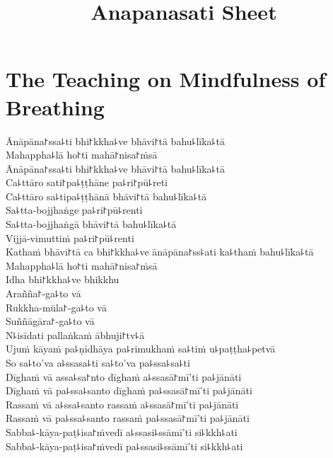 \documentclass[
  babelLanguage=english,
  final,
  webversion,
]{chantingbook}
\title{Anapanasati Sheet}
\begin{document}
\mainmatter


\chapter{The Teaching on Mindfulness of Breathing}

\begin{leader}
\end{leader}

Ānāpāna꜓ssa꜕ti bhi꜓kkha꜕ve bhāvi꜓tā bahu꜕līka꜕tā\\
Mahappha꜕lā ho꜓ti mahā꜓nisa꜓ṁsā\\
Ānāpāna꜓ssa꜕ti bhi꜓kkha꜕ve bhāvi꜓tā bahu꜕līka꜕tā\\
Ca꜕ttāro sati꜓pa꜕ṭṭhāne pa꜕ri꜓pū꜕reti\\
Ca꜕ttāro sa꜕tipa꜕ṭṭhānā bhāvi꜓tā bahu꜕līka꜕tā\\
Sa꜕tta-bojjhaṅge pa꜕ri꜓pū꜕renti\\
Sa꜕tta-bojjhaṅgā bhāvi꜓tā bahu꜕līka꜕tā\\
Vijjā-vimuttiṁ pa꜕ri꜓pū꜕renti\\
Kathaṁ bhāvi꜓tā ca bhi꜓kkha꜕ve ānāpāna꜓ss꜕ati ka꜕thaṁ bahu꜕līka꜕tā\\
Mahappha꜕lā ho꜓ti mahā꜓nisa꜓ṁsā\\
Idha bhi꜓kkha꜕ve bhikkhu\\
Arañña꜓-ga꜕to vā\\
Rukkha-mūla꜓-ga꜕to vā\\
Suññāgāra꜓-ga꜕to vā\\
N꜕isīdati pallaṅkaṁ ābhuji꜓tv꜕ā\\
Ujuṁ kāyaṁ pa꜕ṇidhāya pa꜕rimukhaṁ sa꜕tiṁ u꜕paṭṭha꜕petvā\\
So sa꜕to'va a꜕ssasa꜕ti sa꜕to'va pa꜕ssa꜕sa꜕ti\\
Dīghaṁ vā assa꜕sa꜓nto dīghaṁ a꜕ssasā꜓mī'ti pa꜕jānāti\\
Dīghaṁ vā pa꜕ssa꜕santo dīghaṁ pa꜕ssasā꜓mī'ti pa꜕jānāti\\
Rassaṁ vā a꜕ssa꜕santo rassaṁ a꜕ssasā꜓mī'ti pa꜕jānāti\\
Rassaṁ vā pa꜕ssa꜕santo rassaṁ pa꜕ssasā꜓mī'ti pa꜕jānāti\\
Sabba꜕-kāya-paṭ꜕isa꜓ṁvedī a꜕ssasi꜕ssāmī'ti si꜕kkh꜕ati\\
Sabba꜕-kāya-paṭ꜕isa꜓ṁvedī pa꜕ssasi꜕ssāmī'ti si꜕kkh꜕ati

\clearpage

\enlargethispage{2\baselineskip}
\end{document}
